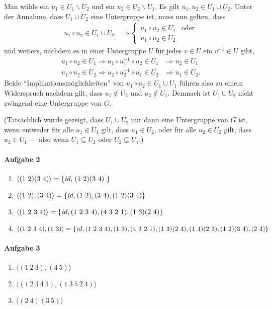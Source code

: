 \documentclass{article}
\begin{document}
\begin{enumerate}
    Man wähle ein $u_1 \in U_1 \backslash U_2$ und ein $u_2 \in U_2 \backslash U_1$. Es gilt $u_1, u_2 \in U_1 \cup U_2$. Unter der Annahme, dass $U_1 \cup U_2$ eine Untergruppe ist, muss nun gelten, dass
    \begin{align*}
        u_1 \circ u_2 \in U_1 \cup U_2 &\Rightarrow \begin{cases}
            u_1 \circ u_2 \in U_1 & \text{oder} \\
            u_1 \circ u_2 \in U_2
        \end{cases}
    \end{align*}
    und weiters, nachdem es in einer Untergruppe $U$ für jedes $v \in U$ ein $v^{-1} \in U$ gibt,
    \begin{align*}
        u_1 \circ u_2 \in U_1 \Rightarrow u_1 \circ u_1^{-1} \circ u_2 \in U_1 &\Rightarrow u_2 \in U_1 \\
        u_1 \circ u_2 \in U_2 \Rightarrow u_2 \circ u_2^{-1} \circ u_1 \in U_2 &\Rightarrow u_1 \in U_2.
    \end{align*}
    Beide \enquote{Implikationsmöglichkeiten} von $u_1 \circ u_2 \in U_1 \cup U_1$ führen also zu einem Widerspruch nachdem gilt, dass $u_1 \notin U_2$ und $u_2 \notin U_1$. Demnach ist $U_1 \cup U_2$ nicht zwingend eine Untergruppe von $G$.

    (Tatsächlich wurde gezeigt, dass $U_1 \cup U_2$ nur dann eine Untergruppe von $G$ ist, wenn entweder für alle $u_1 \in U_1$ gilt, dass $u_1 \in U_2$, oder für alle $u_2 \in U_2$ gilt, dass $u_2 \in U_1$ --- also wenn $U_1 \subseteq U_2$ oder $U_2 \subseteq U_1$.)
\end{enumerate}

\paragraph{Aufgabe 2}

\begin{enumerate}
    \item $\langle (1\ 2)(3\ 4) \rangle = \{ \text{\emph{id}, (1\ 2)(3\ 4) } \}$
    
    \item $\langle (1\ 2), (3\ 4) \rangle = \{ \text{\emph{id}}, (1\ 2), (3\ 4), (1\ 2)(3\ 4) \}$
    
    \item $\langle (1\ 2\ 3\ 4) \rangle = \{ \text{\emph{id}}, (1\ 2\ 3\ 4), (4\ 3\ 2\ 1), (1\ 3)(2\ 4) \}$
    
    \item $\langle (1\ 2\ 3\ 4), (1\ 3) \rangle = \{ \text{\emph{id}}, (1\ 2\ 3\ 4), (1\ 3), (4\ 3\ 2\ 1), (1\ 3)(2\ 4), (1\ 4)(2\ 3), (1\ 2)(3\ 4), (2\ 4) \}$
\end{enumerate}

\paragraph{Aufgabe 3}

\begin{enumerate}
    \item $\langle (1\ 2\ 3), (4\ 5) \rangle$
    \item $\langle (1\ 2\ 3\ 4\ 5), (1\ 3\ 5\ 2\ 4) \rangle$
    \item $\langle (2\ 4)(3\ 5) \rangle$
\end{enumerate}
\end{document}
